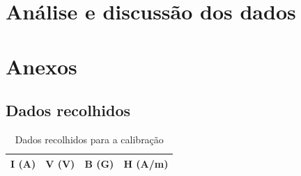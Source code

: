 \documentclass[a4paper]{article}
\begin{document}
\section{Análise e discussão dos dados}

\newpage
\section{Anexos}
\subsection{Dados recolhidos}
\begin{table}[htbp]
\center
\caption{Dados recolhidos para a calibração}
\begin{tabular}{rlrlrlrl}
\hline
\multicolumn{ 2}{c}{I (A)} & \multicolumn{ 2}{c}{V (V)} & \multicolumn{ 2}{c}{B (G)} & \multicolumn{ 2}{c}{H (A/m)} \\ \hline


\end{tabular}
\end{table}
\end{document}
